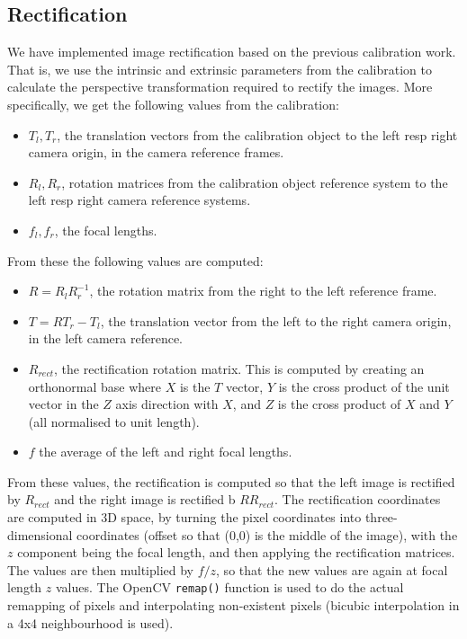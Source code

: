 \subsection{Rectification}
\label{sec:rectification}

We have implemented image rectification based on the previous calibration work.
That is, we use the intrinsic and extrinsic parameters from the calibration to
calculate the perspective transformation required to rectify the images. More
specifically, we get the following values from the calibration:

\begin{itemize}
\item $T_l,T_r$, the translation vectors from the calibration object to the left
  resp right camera origin, in the camera reference frames.

\item $R_l,R_r$, rotation matrices from the calibration object reference system to
  the left resp right camera reference systems.

\item $f_l, f_r$, the focal lengths.
\end{itemize}

From these the following values are computed:

\begin{itemize}
\item $R=R_lR_r^{-1}$, the rotation matrix from the right to the left reference
  frame.

\item $T=RT_r-T_l$, the translation vector from the left to the right camera
  origin, in the left camera reference.

\item $R_{rect}$, the rectification rotation matrix. This is computed by
  creating an orthonormal base where $X$ is the $T$ vector, $Y$ is the cross
  product of the unit vector in the $Z$ axis direction with $X$, and $Z$ is the
  cross product of $X$ and $Y$ (all normalised to unit length).

\item $f$ the average of the left and right focal lengths.
\end{itemize}

From these values, the rectification is computed so that the left image is
rectified by $R_{rect}$ and the right image is rectified b $RR_{rect}$. The
rectification coordinates are computed in 3D space, by turning the pixel
coordinates into three-dimensional coordinates (offset so that (0,0) is the
middle of the image), with the $z$ component being the focal length, and then
applying the rectification matrices. The values are then multiplied by $f/z$, so
that the new values are again at focal length $z$ values. The OpenCV
\texttt{remap()} function is used to do the actual remapping of pixels and
interpolating non-existent pixels (bicubic interpolation in a 4x4 neighbourhood
is used).

